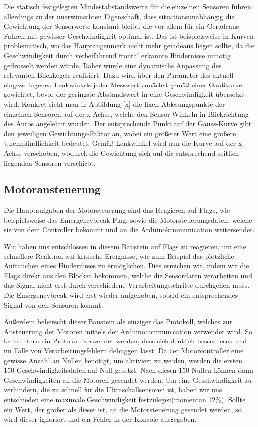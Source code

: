 \documentclass[12pt,a4paper]{report}
\begin{document}
Die statisch festgelegten Mindestabstandswerte für die einzelnen Sensoren führen allerdings zu der unerwünschten Eigenschaft, dass situationsunabhängig die Gewichtung der Sensorwerte konstant bleibt, die vor allem für ein Geradeaus-Fahren mit gewisser Geschwindigkeit optimal ist. Das ist beispielsweise in Kurven problematisch, wo das Hauptaugenmerk nicht mehr geradeaus liegen sollte, da die Geschwindigkeit durch verbeifahrend frontal erkannte Hindernisse unnötig gedrosselt werden würde. Daher wurde eine dynamische Anpassung des relevanten Blickkegels realisiert. Dazu wird über den Parameter des aktuell eingeschlagenen Lenkwinkels jeder Messwert zunächst gemäß einer Gaußkurve gewichtet, bevor der geringste Abstandswert in eine Geschwindigkeit übersetzt wird. Konkret sieht man in Abbildung [x] die fixen Ablesungspunkte der einzelnen Sensoren auf der x-Achse, welche den Sensor-Winkeln in Blickrichtung des Autos angelehnt wurden. Der entsprechende Punkt auf der Gauss-Kurve gibt den jeweiligen Gewichtungs-Faktor an, wobei ein größerer Wert eine größere Unempfindlichkeit bedeutet. Gemäß Lenkwinkel wird nun die Kurve auf der x-Achse verschoben, wodurch die Gewichtung sich auf die entsprechend seitlich liegenden Sensoren verschiebt.


\subsection{Motoransteuerung}
Die Hauptaufgaben der Motorsteuerung sind das Reagieren auf Flags, wie beispielsweise das Emergencybreak-Flag, sowie die Motorsteuerungsdaten, welche sie von dem Controller bekommt und an die Arduinokommunication weitersendet.

Wir haben uns entschlossen in diesem Baustein auf Flags zu reagieren, um eine schnellere Reaktion auf kritische Ereignisse, wie zum Beispiel das plötzliche Auftauchen eines Hindernisses zu ermöglichen. Dies erreichen wir, indem wir die Flags direkt aus den Blöcken bekommen, welche die Sensordaten verarbeiten und das Signal nicht erst durch verschiedene Verarbeitungsschritte durchgehen muss. Die Emergencybreak wird erst wieder aufgehoben, sobald ein entsprechendes Signal von den Sensoren kommt.

Außerdem beherscht dieser Baustein als einziger das Protokoll, welches zur Ansteuerung der Motoren mittels der Arduinocommunication verwendet wird. So kann intern ein Protokoll verwendet werden, dass sich deutlich besser lesen und im Falle von Verarbeitungsfehlern debuggen lässt. Da der Motorcontroller eine gewisse Anzahl an Nullen benötigt, um aktiviert zu werden, werden die ersten 150 Geschwindigkeitsdaten auf Null gesetzt. Nach diesen 150 Nullen können dann Geschwindigkeiten an die Motoren gesendet werden. Um eine Geschwindigkeit zu verhindern, die zu schnell für die Ultraschallsensoren ist, haben wir uns entschieden eine maximale Geschwindigkeit festzulegen(momentan 12\%). Sollte ein Wert, der größer als dieser ist, an die Motorsteuerung gesendet werden, so wird dieser ignoriert und ein Fehler in der Konsole ausgegeben.
\end{document}
